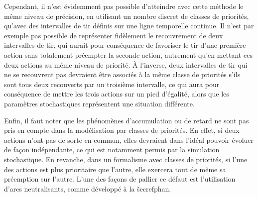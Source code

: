 \myskip

Cependant, il n'est évidemment pas possible d'atteindre
avec cette méthode le même niveau de précision, en utilisant un nombre
discret de classes de priorités,
qu'avec des intervalles de tir définis sur une ligne temporelle continue.
Il n'est par exemple
pas possible de représenter fidèlement le recouvrement de deux intervalles de tir,
qui aurait pour conséquence de favoriser le tir d'une première action sans totalement
préempter la seconde action,
autrement qu'en mettant ces deux actions au même niveau de priorité.
À l'inverse, deux intervalles de tir qui ne se recouvrent pas devraient être associés à la même
classe de priorités s'ils sont tous deux recouverts par un troisième intervalle,
ce qui aura pour conséquence de mettre les trois actions sur un pied d'égalité, alors que les
paramètres stochastiques représentent une situation différente.


Enfin, il faut noter que
les phénomènes d'accumulation ou de retard ne sont pas pris en compte dans la modélisation
par classes de priorités.
En effet, si deux actions n'ont pas de sorte en commun, elles devraient dans l'idéal pouvoir
évoluer de façon indépendante, ce qui est notamment permis par la simulation stochastique.
En revanche, dans un formalisme avec classes de priorités, si l'une des actions est plus
prioritaire que l'autre, elle exercera tout de même sa préemption sur l'autre.
L'une des façons de pallier ce défaut est l'utilisation d'arcs neutralisants,
comme développé à la \v secref{phan}.

